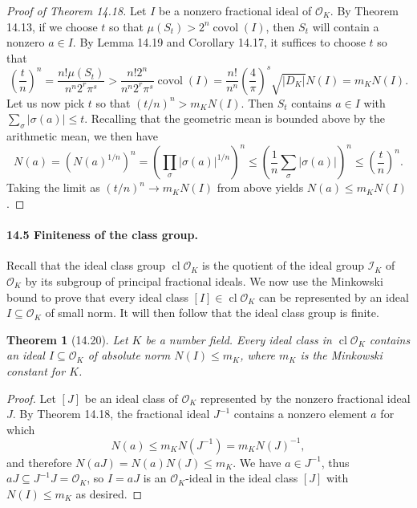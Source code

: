 \documentclass[UTF8,11pt]{ctexart}
\newtheorem*{theorem}{Theorem}
\newcommand{\covol}{\operatorname{covol}}
\begin{document}
\begin{proof}[Proof of Theorem 14.18]
Let $I$ be a nonzero fractional ideal of $\mathcal O_K$. By Theorem 14.13, if we choose $t$ so that $\mu(S_t)>2^n\covol(I)$, then $S_t$ will contain a nonzero $a\in I$. By Lemma 14.19 and Corollary 14.17, it suffices to choose $t$ so that
\[
\left(\frac tn\right)^n
=\frac{n!\mu(S_t)}{n^n2^r\pi^s}
>\frac{n!2^n}{n^n2^r\pi^s}\covol(I)
=\frac{n!}{n^n}\left(\frac4\pi\right)^s\sqrt{|D_K|}N(I)
=m_KN(I).
\]
Let us now pick $t$ so that $(t/n)^n>m_KN(I)$. Then $S_t$ contains $a\in I$ with $\sum_\sigma|\sigma(a)|\le t$. Recalling that the geometric mean is bounded above by the arithmetic mean, we then have
\[
N(a)=\left(N(a)^{1/n}\right)^n
=\left(\prod_\sigma|\sigma(a)|^{1/n}\right)^n
\le\left(\frac1n\sum_\sigma|\sigma(a)|\right)^n
\le\left(\frac tn\right)^n.
\]
Taking the limit as $(t/n)^n\to m_KN(I)$ from above yields $N(a)\le m_KN(I)$.
\end{proof}

\paragraph{14.5 Finiteness of the class group.}
Recall that the ideal class group $\operatorname{cl}\mathcal O_K$ is the quotient of the ideal group $\mathcal I_K$ of $\mathcal O_K$ by its subgroup of principal fractional ideals. We now use the Minkowski bound to prove that every ideal class $[I]\in\operatorname{cl}\mathcal O_K$ can be represented by an ideal $I\subseteq\mathcal O_K$ of small norm. It will then follow that the ideal class group is finite.

\begin{theorem}[14.20]
Let $K$ be a number field. Every ideal class in $\operatorname{cl}\mathcal O_K$ contains an ideal $I\subseteq\mathcal O_K$ of absolute norm $N(I)\le m_K$, where $m_K$ is the Minkowski constant for $K$.
\end{theorem}
\begin{proof}
Let $[J]$ be an ideal class of $\mathcal O_K$ represented by the nonzero fractional ideal $J$. By Theorem 14.18, the fractional ideal $J^{-1}$ contains a nonzero element $a$ for which
\[
N(a)\le m_KN(J^{-1})=m_KN(J)^{-1},
\]
and therefore $N(aJ)=N(a)N(J)\le m_K$. We have $a\in J^{-1}$, thus $aJ\subseteq J^{-1}J=\mathcal O_K$, so $I=aJ$ is an $\mathcal O_K$-ideal in the ideal class $[J]$ with $N(I)\le m_K$ as desired.
\end{proof}
\end{document}
